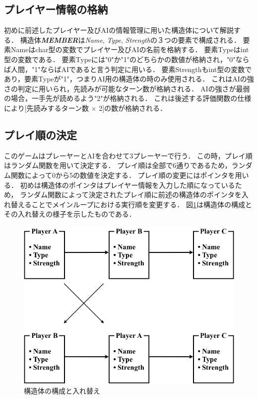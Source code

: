 \documentclass[a4paper,10pt]{jsarticle}
\begin{document}
\subsection{プレイヤー情報の格納}
初めに前述したプレイヤー及びAIの情報管理に用いた構造体について解説する．
構造体\textbf{\textit{MEMBER}}は\textit{Name}, \textit{Type}, \textit{Strength}の３つの要素で構成される．
要素Nameはchar型の変数でプレイヤー及びAIの名前を格納する．
要素Typeはint型の変数である．
要素Typeには"0"か"1"のどちらかの数値が格納され，"0"ならば人間，"1"ならばAIであると言う判定に用いる．
要素Strengthもint型の変数であり，要素Typeが"1"，つまりAI用の構造体の時のみ使用される．
これはAIの強さの判定に用いられ，先読みが可能なターン数が格納される．
AIの強さが最弱の場合，一手先が読めるよう"2"が格納される．
これは後述する評価関数の仕様により[先読みするターン数 $\times$ 2]の数が格納される．
\subsection{プレイ順の決定}
このゲームはプレーヤーとAIを合わせて3プレーヤーで行う．
この時，プレイ順はランダム関数を用いて決定する．
プレイ順は全部で6通りであるため，ランダム関数によって0から5の数値を決定する．
プレイ順の変更にはポインタを用いる．
初めは構造体のポインタはプレイヤー情報を入力した順になっているため，
ランダム関数によって決定されたプレイ順に前述の構造体のポインタを入れ替えることでメインループにおける実行順を変更する．
図\ref{fig:Ch.Kouzoutai}は構造体の構成とその入れ替えの様子を示したものである．
\begin{figure}[h]
  \centering
  \includegraphics[width=120mm]{./image/Kouzoutai_Change.png}
  \caption{構造体の構成と入れ替え}
  \label{fig:Ch.Kouzoutai}
\end{figure}
\end{document}
